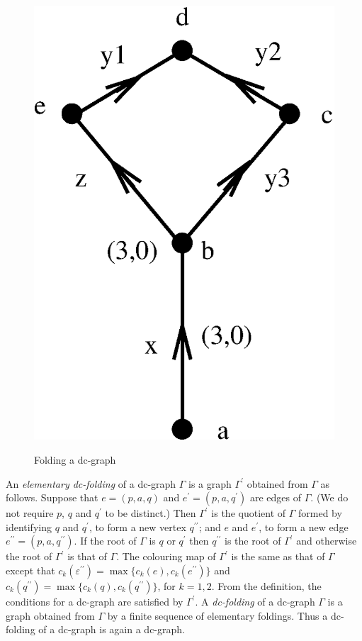 \documentclass[a4paper,12pt]{article}
\newcommand{\G}{\Gamma }
\newcommand{\e}{\varepsilon }
\numberwithin{equation}{section}
\numberwithin{figure}{section}
\begin{document}
\begin{figure}
\begin{center}
{\includegraphics[scale=.5]{dc-folded.eps}
\label{fig:dc-graphb}
}
\end{center}
\caption{Folding a  dc-graph}\label{fig:dc-graph}
\end{figure}
An {\em elementary dc-folding} of a dc-graph $\G$ is a graph $\G^\prime$
obtained from $\G$ as follows. Suppose that $e=(p,a,q)$ and 
$e^\prime=(p,a,q^\prime)$
are edges of $\G$. (We do not require $p$, $q$ and $q^\prime$ to be distinct.) 
 Then $\G^\prime$ is the quotient of $\G$ formed by identifying 
$q$ and $q^\prime$, to form a new vertex $q^{\prime\prime}$; and 
$e$ and $e^\prime$, to form a new edge 
$e^{\prime\prime}=(p,a,q^{\prime\prime})$. If the root of $\G$ is $q$
 or $q^\prime$ then $q^{\prime\prime}$ is the root of $\G^\prime$ and otherwise
 the root of $\G^\prime$ is that of $\G$. The colouring map of $\G^\prime$
is the same as that of $\G$ except that  
 $c_k(\e^{\prime\prime})=\max\{c_k(e),c_k(e^{\prime\prime})\}$ 
and $c_k(q^{\prime\prime})=\max\{c_k(q),c_k(q^{\prime\prime})\}$,
for $k=1,2$. 
From the definition, the conditions for a dc-graph are satisfied by 
$\G^\prime$. A {\em dc-folding} of a dc-graph $\G$ is a graph obtained 
from $\G$ by a finite sequence of elementary foldings. Thus a dc-folding 
of a dc-graph is again a dc-graph. 
\end{document}
